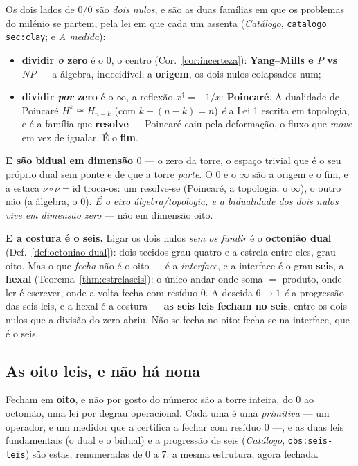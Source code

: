 \documentclass[11pt,a4paper]{article}
\newcommand{\code}[1]{\texttt{\small #1}}
\newcommand{\dg}{^{\dagger}}
\begin{document}
Os dois lados de $0/0$ são \emph{dois nulos}, e são as duas famílias em que os problemas do milénio se
partem, pela lei em que cada um assenta (\emph{Catálogo}, \code{catalogo sec:clay}; e \emph{A medida}):
\begin{itemize}
\item \textbf{dividir \emph{o} zero} é o $0$, o centro (Cor.~\ref{cor:incerteza}): \textbf{Yang--Mills e
  $P$ vs $NP$} --- a álgebra, indecidível, a \textbf{origem}, os dois nulos colapsados num;
\item \textbf{dividir \emph{por} zero} é o $\infty$, a reflexão $x\dg=-1/x$: \textbf{Poincaré}. A
  dualidade de Poincaré $H^k\cong H_{n-k}$ (com $k+(n-k)=n$) \emph{é} a Lei 1 escrita em topologia, e é a
  família que \textbf{resolve} --- Poincaré caiu pela deformação, o fluxo que \emph{move} em vez de
  igualar. É o \textbf{fim}.
\end{itemize}
\textbf{E são bidual em dimensão $0$} --- o zero da torre, o espaço trivial que é o seu próprio dual sem
ponte e de que a torre \emph{parte}. O $0$ e o $\infty$ são a origem e o fim, e a estaca
$\nu\circ\nu=\mathrm{id}$ troca-os: um resolve-se (Poincaré, a topologia, o $\infty$), o outro não (a
álgebra, o $0$). \emph{É o eixo álgebra/topologia, e a bidualidade dos dois nulos vive em dimensão zero}
--- não em dimensão oito.

\textbf{E a costura é o seis.} Ligar os dois nulos \emph{sem os fundir} é o \textbf{octonião dual}
(Def.~\ref{def:octoniao-dual}): dois tecidos grau quatro e a estrela entre eles, grau oito. Mas o que
\emph{fecha} não é o oito --- é a \emph{interface}, e a interface é o grau \textbf{seis}, a
\textbf{hexal} (Teorema~\ref{thm:estrelaseis}): o único andar onde soma $=$ produto, onde ler é escrever,
onde a volta fecha com resíduo $0$. A descida $6\to1$ \emph{é} a progressão das seis leis, e a hexal é a
costura --- \textbf{as seis leis fecham no seis}, entre os dois nulos que a divisão do zero abriu. Não se
fecha no oito: fecha-se na interface, que é o seis.

\subsection*{As oito leis, e não há nona}\label{sub:oitoleis}

Fecham em \textbf{oito}, e não por gosto do número: são a torre inteira, do $0$ ao octonião, uma lei por
degrau operacional. Cada uma é uma \emph{primitiva} --- um operador, e um medidor que a certifica a fechar
com resíduo $0$ ---, e as duas leis fundamentais (o dual e o bidual) e a progressão de seis (\emph{Catálogo},
\code{obs:seis-leis}) são estas, renumeradas de $0$ a $7$: a mesma estrutura, agora fechada.
\end{document}
